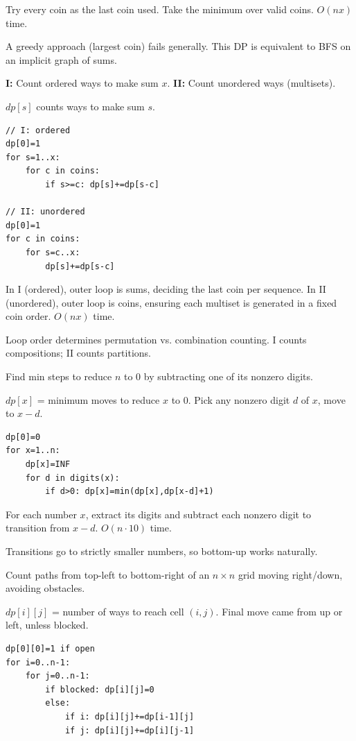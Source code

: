\Solution Try every coin as the last coin used. Take the minimum over valid coins. $O(nx)$ time.

\Analysis A greedy approach (largest coin) fails generally. This DP is equivalent to BFS on an implicit graph of sums.


\Problem \textbf{I:} Count ordered ways to make sum $x$. \textbf{II:} Count unordered ways (multisets).

\State $dp[s]$ counts ways to make sum $s$.
\begin{lstlisting}
// I: ordered
dp[0]=1
for s=1..x:
    for c in coins:
        if s>=c: dp[s]+=dp[s-c]

// II: unordered
dp[0]=1
for c in coins:
    for s=c..x:
        dp[s]+=dp[s-c]
\end{lstlisting}

\Solution In I (ordered), outer loop is sums, deciding the last coin per sequence. In II (unordered), outer loop is coins, ensuring each multiset is generated in a fixed coin order. $O(nx)$ time.

\Analysis Loop order determines permutation vs. combination counting. I counts compositions; II counts partitions.


\Problem Find min steps to reduce $n$ to $0$ by subtracting one of its nonzero digits.

\State $dp[x]$ = minimum moves to reduce $x$ to $0$.
\Trans Pick any nonzero digit $d$ of $x$, move to $x-d$.
\begin{lstlisting}
dp[0]=0
for x=1..n:
    dp[x]=INF
    for d in digits(x):
        if d>0: dp[x]=min(dp[x],dp[x-d]+1)
\end{lstlisting}

\Solution For each number $x$, extract its digits and subtract each nonzero digit to transition from $x-d$. $O(n \cdot 10)$ time.

\Analysis Transitions go to strictly smaller numbers, so bottom-up works naturally.


\Problem Count paths from top-left to bottom-right of an $n \times n$ grid moving right/down, avoiding obstacles.

\State $dp[i][j]$ = number of ways to reach cell $(i,j)$.
\Trans Final move came from up or left, unless blocked.
\begin{lstlisting}
dp[0][0]=1 if open
for i=0..n-1:
    for j=0..n-1:
        if blocked: dp[i][j]=0
        else:
            if i: dp[i][j]+=dp[i-1][j]
            if j: dp[i][j]+=dp[i][j-1]
\end{lstlisting}

